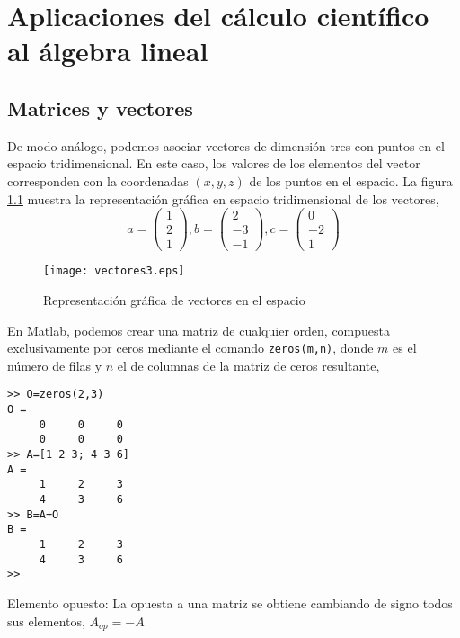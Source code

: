 \chapter{Aplicaciones del cálculo científico al álgebra lineal}

\section{Matrices y vectores}


De modo análogo, podemos asociar vectores de dimensión tres con puntos en el espacio tridimensional. En este caso, los valores de los elementos del vector corresponden con la coordenadas $(x,y,z)$ de los puntos en el espacio. La figura \ref{fig:vectores3} muestra la representación gráfica en espacio tridimensional de los vectores, 
\begin{equation*}
a=
\begin{pmatrix}
1\\
2\\
1
\end{pmatrix},
b=
\begin{pmatrix}
2\\
-3\\
-1
\end{pmatrix},
c=
\begin{pmatrix}
0\\
-2\\
1
\end{pmatrix}
\end{equation*}

\begin{figure}[h]
\centering
\texttt{[image: vectores3.eps]}
\caption{Representación gráfica de vectores en el espacio}
\label{fig:vectores3}
\end{figure}


En Matlab, podemos crear una matriz de cualquier orden, compuesta exclusivamente por ceros mediante el comando \texttt{zeros(m,n)}, donde $m$ es el número de filas y $n$ el de columnas de la matriz de ceros resultante,

\begin{verbatim}
>> O=zeros(2,3)
O =
     0     0     0
     0     0     0
>> A=[1 2 3; 4 3 6]
A =
     1     2     3
     4     3     6
>> B=A+O
B =
     1     2     3
     4     3     6
>> 
\end{verbatim}
\item Elemento opuesto: La opuesta a una matriz se obtiene cambiando de signo todos sus elementos, $A_{op}=-A$

